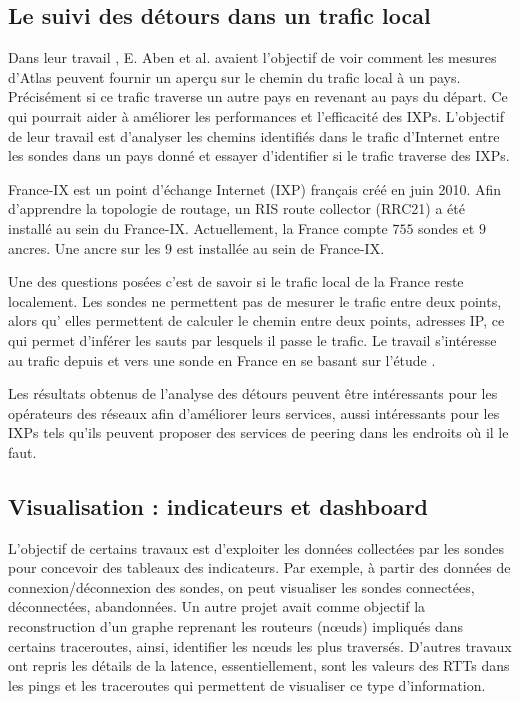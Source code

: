 \subsection{Le suivi des détours dans un trafic local}

Dans leur travail \cite{Emile-Aben-IXP-countries}, E. Aben et al. avaient l'objectif de  voir comment les mesures d'Atlas peuvent fournir un aperçu sur le chemin du trafic local à un pays. Précisément si ce trafic traverse un autre pays en revenant au pays du départ.  Ce qui pourrait  aider à améliorer les performances et l'efficacité des IXPs.  L'objectif de leur travail  est  d'analyser les chemins identifiés dans le trafic d'Internet entre les sondes dans un pays donné et essayer d'identifier si le trafic  traverse des IXPs.


France-IX est un point d'échange Internet (IXP) français créé en juin 2010. Afin d'apprendre la topologie de routage, un RIS route collector (RRC21) a été installé au sein du France-IX. Actuellement, la France compte $755$ sondes   et $9$ ancres. Une ancre sur les $9$ est installée au sein de France-IX.

Une des questions posées c'est de savoir si le trafic local de la France reste localement.  Les sondes   ne permettent pas de mesurer le trafic entre deux points, alors qu' elles permettent de calculer le chemin entre deux points, adresses IP, ce qui permet d'inférer les sauts par lesquels il passe le trafic. Le travail \cite{France-IX} s'intéresse au trafic depuis et vers une sonde en France en se basant sur l'étude \cite{Emile-Aben-IXP-countries}.


Les résultats obtenus de l'analyse des détours peuvent être intéressants pour les opérateurs des réseaux afin d'améliorer leurs services, aussi intéressants pour les IXPs tels qu'ils peuvent  proposer des services de peering dans les endroits où il le faut.


\subsection{Visualisation : indicateurs et dashboard}

L'objectif de certains travaux est  d'exploiter les données collectées par les sondes  pour concevoir des tableaux des indicateurs. Par exemple, à partir des données de connexion/déconnexion des sondes, on peut visualiser les sondes connectées, déconnectées, abandonnées. Un autre projet avait comme objectif la reconstruction d'un graphe reprenant les routeurs (n\oe{}uds) impliqués dans certains traceroutes, ainsi, identifier les n\oe{}uds les plus traversés. D'autres travaux ont repris les détails de la latence, essentiellement, sont les valeurs des RTTs dans les pings et les traceroutes qui permettent de visualiser ce type d'information. 


